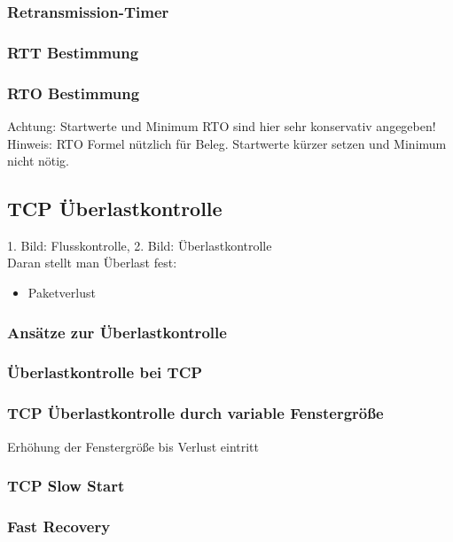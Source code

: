 \subsubsection{Retransmission-Timer}
\subsubsection*{RTT Bestimmung}
\subsubsection*{RTO Bestimmung}
Achtung: Startwerte und Minimum RTO sind hier sehr konservativ angegeben!\\
Hinweis: RTO Formel nützlich für Beleg. Startwerte kürzer setzen und Minimum nicht nötig.

\subsection{TCP Überlastkontrolle}
1. Bild: Flusskontrolle, 2. Bild: Überlastkontrolle\\
Daran stellt man Überlast fest:
\begin{itemize}
\item Paketverlust
\end{itemize}
\subsubsection{Ansätze zur Überlastkontrolle}
\subsubsection{Überlastkontrolle bei TCP}
\subsubsection{TCP Überlastkontrolle durch variable Fenstergröße}
Erhöhung der Fenstergröße bis Verlust eintritt
\subsubsection{TCP Slow Start}
\subsubsection{Fast Recovery}

